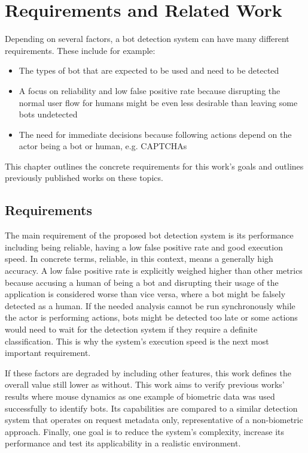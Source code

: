 \documentclass[
    fontsize=12pt,
    headings=small,
    parskip=half,           %
    bibliography=totoc,
    numbers=noenddot,       %
    open=any,               %
    final,                   %
    table
]{scrreprt}
\begin{document}
\label{sec:requirements_and_related_work}
\chapter{Requirements and Related Work}

Depending on several factors, a bot detection system can have many different requirements. These include for example:

\begin{itemize}
    \item The types of bot that are expected to be used and need to be detected
    \item A focus on reliability and low false positive rate because disrupting the normal user flow for humans might be even less desirable than leaving some bots undetected
    \item The need for immediate decisions because following actions depend on the actor being a bot or human, e.g. CAPTCHAs
\end{itemize}

This chapter outlines the concrete requirements for this work's goals and outlines previously published works on these topics.


\section{Requirements}

The main requirement of the proposed bot detection system is its performance including being reliable, having a low false positive rate and good execution speed. In concrete terms, reliable, in this context, means a generally high accuracy. A low false positive rate is explicitly weighed higher than other metrics because accusing a human of being a bot and disrupting their usage of the application is considered worse than vice versa, where a bot might be falsely detected as a human. If the needed analysis cannot be run synchronously while the actor is performing actions, bots might be detected too late or some actions would need to wait for the detection system if they require a definite classification. This is why the system's execution speed is the next most important requirement.

If these factors are degraded by including other features, this work defines the overall value still lower as without. This work aims to verify previous works' results where mouse dynamics as one example of biometric data was used successfully to identify bots. Its capabilities are compared to a similar detection system that operates on request metadata only, representative of a non-biometric approach. Finally, one goal is to reduce the system's complexity, increase its performance and test its applicability in a realistic environment.
\end{document}
